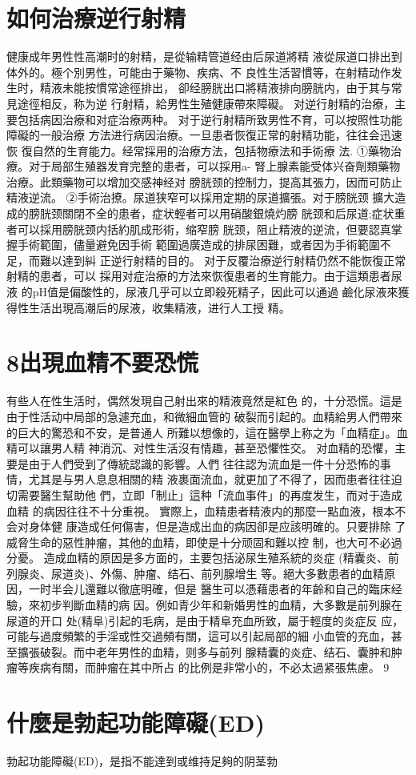 \documentclass[12pt,UTF8]{ctexbook}
\begin{document}
\section{如何治療逆行射精}
健康成年男性性高潮时的射精，是從输精管道经由后尿道將精
液從尿道口排出到体外的。極个別男性，可能由于藥物、疾病、不
良性生活習慣等，在射精动作发生时，精液未能按慣常途徑排出，
卻经膀胱出口將精液排向膀胱内，由于其与常見途徑相反，称为逆
行射精，給男性生殖健康帶來障礙。
对逆行射精的治療，主要包括病因治療和对症治療两种。
对于逆行射精所致男性不育，可以按照性功能障礙的一般治療
方法进行病因治療。一旦患者恢復正常的射精功能，往往会迅速恢
復自然的生育能力。经常採用的治療方法，包括物療法和手術療
法.
①藥物治療。对于局部生殖器发育完整的患者，可以採用a-
腎上腺素能受体兴奋劑類藥物治療。此類藥物可以增加交感神经对
膀胱颈的控制力，提高其張力，因而可防止精液逆流。
②手術治撩。尿道狭窄可以採用定期的尿道擴張。对于膀胱颈
擴大造成的膀胱颈關閉不全的患者，症状輕者可以用硝酸銀燒灼膀
胱颈和后尿道;症状重者可以採用膀胱颈内括約肌成形術，缩窄膀
胱颈，阻止精液的逆流，但要認真掌握手術範圍，儘量避免因手術
範圍過廣造成的排尿困難，或者因为手術範圍不足，而難以達到糾
正逆行射精的目的。
对于反覆治療逆行射精仍然不能恢復正常射精的患者，可以
採用对症治療的方法來恢復患者的生育能力。由于這類患者尿液
的pH值是偏酸性的，尿液几乎可以立即殺死精子，因此可以通過
鹼化尿液來獲得性生活出現高潮后的尿液，收集精液，进行人工授
精。
\section{8出現血精不要恐慌}
有些人在性生活时，偶然发現自己射出來的精液竟然是紅色
的，十分恐慌。這是由于性活动中局部的急遽充血，和微細血管的
破裂而引起的。血精給男人們帶來的巨大的驚恐和不安，是普通人
所難以想像的，這在醫學上称之为「血精症」。血精可以讓男人精
神消沉、对性生活沒有情趣，甚至恐懼性交。
对血精的恐懼，主要是由于人們受到了傳統認識的影響。人們
往往認为流血是一件十分恐怖的事情，尤其是与男人息息相關的精
液裹面流血，就更加了不得了，因而患者往往迫切需要醫生幫助他
們，立即「制止」這种「流血事件」的再度发生，而对于造成血精
的病因往往不十分重視。
實際上，血精患者精液内的那麼一點血液，根本不会对身体健
康造成任何傷害，但是造成出血的病因卻是应該明確的。只要排除
了威脅生命的惡性肿瘤，其他的血精，即使是十分顽固和難以控
制，也大可不必過分憂。
造成血精的原因是多方面的，主要包括泌尿生殖系統的炎症
(精囊炎、前列腺炎、尿道炎)、外傷、肿瘤、结石、前列腺增生
等。絕大多數患者的血精原因，一时半会儿還難以徹底明確，但是
醫生可以憑藉患者的年齡和自己的臨床经驗，來初步判斷血精的病
因。例如青少年和新婚男性的血精，大多數是前列腺在尿道的开口
处(精阜)引起的毛病，是由于精阜充血所致，屬于輕度的炎症反
应，可能与過度頻繁的手淫或性交過頻有關，這可以引起局部的細
小血管的充血，甚至擴張破裂。而中老年男性的血精，则多与前列
腺精囊的炎症、结石、囊肿和肿瘤等疾病有關，而肿瘤在其中所占
的比例是非常小的，不必太過紧張焦慮。
9\section{什麼是勃起功能障礙(ED)}
勃起功能障礙(ED)，是指不能達到或维持足夠的阴茎勃
\end{document}
